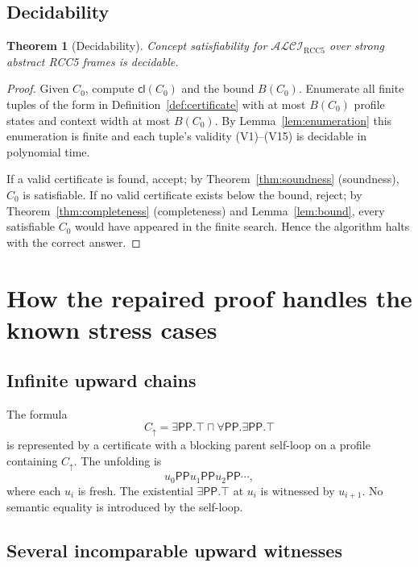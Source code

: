\documentclass[11pt]{article}
\newtheorem{theorem}{Theorem}[section]
\newcommand{\Logic}{\mathcal{ALCI}_{\mathrm{RCC5}}}
\newcommand{\PP}{\mathsf{PP}}
\newcommand{\Cl}{\mathsf{cl}}
\begin{document}
\subsection{Decidability}
\label{ssec:decidability}

\begin{theorem}[Decidability]\label{thm:decidability}
Concept satisfiability for $\Logic$ over strong abstract RCC5 frames
is decidable.
\end{theorem}

\begin{proof}
Given $C_0$, compute $\Cl(C_0)$ and the bound $B(C_0)$.  Enumerate
all finite tuples of the form in Definition~\ref{def:certificate}
with at most $B(C_0)$ profile states and context width at most
$B(C_0)$.  By Lemma~\ref{lem:enumeration} this enumeration is
finite and each tuple's validity (V1)--(V15) is decidable in
polynomial time.

If a valid certificate is found, accept; by Theorem~\ref{thm:soundness}
(soundness), $C_0$ is satisfiable.  If no valid certificate exists
below the bound, reject; by Theorem~\ref{thm:completeness}
(completeness) and Lemma~\ref{lem:bound}, every satisfiable $C_0$
would have appeared in the finite search.  Hence the algorithm halts
with the correct answer.
\end{proof}

\section{How the repaired proof handles the known stress cases}

\subsection{Infinite upward chains}

The formula
\[
  C_\uparrow=\exists\PP.\top\sqcap\forall\PP.\exists\PP.\top
\]
is represented by a certificate with a blocking parent self-loop on a profile containing $C_\uparrow$.  The unfolding is
\[
  u_0\PP u_1\PP u_2\PP\cdots,
\]
where each $u_i$ is fresh.  The existential $\exists\PP.\top$ at $u_i$ is witnessed by $u_{i+1}$.  No semantic equality is introduced by the self-loop.

\subsection{Several incomparable upward witnesses}
\end{document}
